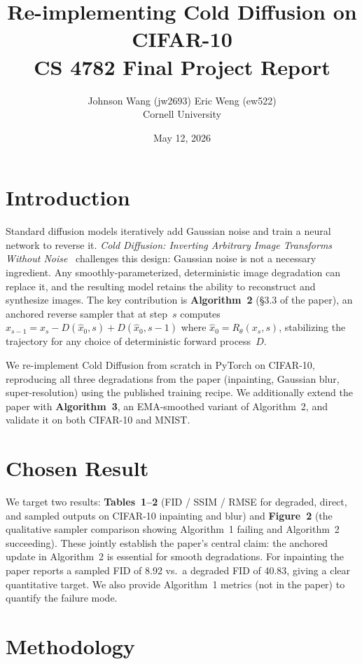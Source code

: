 \documentclass[11pt]{article}
\title{\textbf{Re-implementing Cold Diffusion on CIFAR-10}\\[2pt]
       \large CS 4782 Final Project Report}
\author{Johnson Wang (jw2693) \quad Eric Weng (ew522) \\ Cornell University}
\date{May 12, 2026}
\begin{document}
\maketitle
\vspace{-1.2em}

\section{Introduction}

Standard diffusion models iteratively add Gaussian noise and train a neural network to
reverse it. \emph{Cold Diffusion: Inverting Arbitrary Image Transforms Without
Noise}~\cite{bansal2022} challenges this design: Gaussian noise is not a necessary
ingredient. Any smoothly-parameterized, deterministic image degradation can replace it,
and the resulting model retains the ability to reconstruct and synthesize images. The key
contribution is \textbf{Algorithm~2} (§3.3 of the paper), an anchored reverse sampler
that at step~$s$ computes $x_{s-1} = x_s - D(\hat{x}_0, s) + D(\hat{x}_0, s{-}1)$
where $\hat{x}_0 = R_\theta(x_s, s)$, stabilizing the trajectory for any choice of
deterministic forward process~$D$.

We re-implement Cold Diffusion from scratch in PyTorch on CIFAR-10, reproducing all
three degradations from the paper (inpainting, Gaussian blur, super-resolution) using
the published training recipe. We additionally extend the paper with
\textbf{Algorithm~3}, an EMA-smoothed variant of Algorithm~2, and validate it on both
CIFAR-10 and MNIST.

\section{Chosen Result}

We target two results: \textbf{Tables~1--2} (FID / SSIM / RMSE for degraded, direct, and
sampled outputs on CIFAR-10 inpainting and blur) and \textbf{Figure~2} (the qualitative
sampler comparison showing Algorithm~1 failing and Algorithm~2 succeeding). These jointly
establish the paper's central claim: the anchored update in Algorithm~2 is essential for
smooth degradations. For inpainting the paper reports a sampled FID of 8.92 vs.\ a degraded
FID of 40.83, giving a clear quantitative target. We also provide Algorithm~1 metrics
(not in the paper) to quantify the failure mode.

\section{Methodology}
\end{document}
